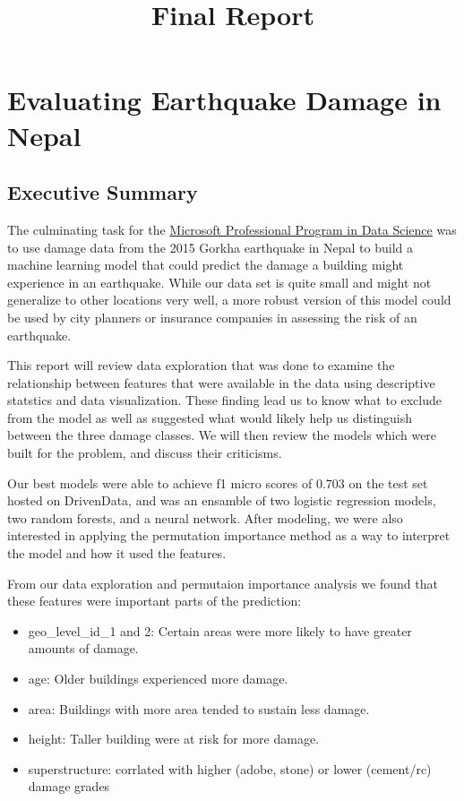 \documentclass[11pt]{article}
\title{Final Report}
\providecommand{\tightlist}{%
      \setlength{\itemsep}{0pt}\setlength{\parskip}{0pt}}
\begin{document}
    
    
    \maketitle
    
    

    
    \section{Evaluating Earthquake Damage in
Nepal}\label{evaluating-earthquake-damage-in-nepal}

\subsection{Executive Summary}\label{executive-summary}

The culminating task for the
\href{https://academy.microsoft.com/en-us/professional-program/tracks/data-science/}{Microsoft
Professional Program in Data Science} was to use damage data from the
2015 Gorkha earthquake in Nepal to build a machine learning model that
could predict the damage a building might experience in an earthquake.
While our data set is quite small and might not generalize to other
locations very well, a more robust version of this model could be used
by city planners or insurance companies in assessing the risk of an
earthquake.

This report will review data exploration that was done to examine the
relationship between features that were available in the data using
descriptive statstics and data visualization. These finding lead us to
know what to exclude from the model as well as suggested what would
likely help us distinguish between the three damage classes. We will
then review the models which were built for the problem, and discuss
their criticisms.

Our best models were able to achieve f1 micro scores of 0.703 on the
test set hosted on DrivenData, and was an ensamble of two logistic
regression models, two random forests, and a neural network. After
modeling, we were also interested in applying the permutation importance
method as a way to interpret the model and how it used the features.

From our data exploration and permutaion importance analysis we found
that these features were important parts of the prediction:

\begin{itemize}
\tightlist
\item
  geo\_level\_id\_1 and 2: Certain areas were more likely to have
  greater amounts of damage.
\item
  age: Older buildings experienced more damage.
\item
  area: Buildings with more area tended to sustain less damage.
\item
  height: Taller building were at risk for more damage.
\item
  superstructure: corrlated with higher (adobe, stone) or lower
  (cement/rc) damage grades
\end{itemize}
\end{document}
